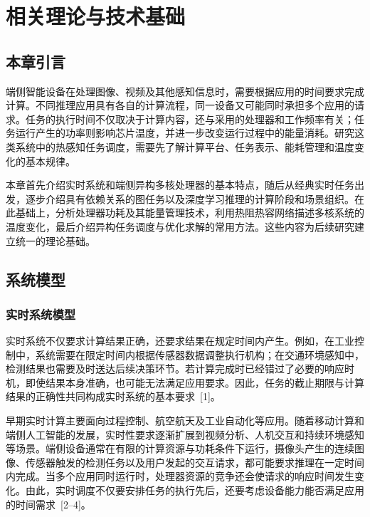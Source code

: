 \chapter{相关理论与技术基础}
\label{ch:foundation}

\section{本章引言}

端侧智能设备在处理图像、视频及其他感知信息时，需要根据应用的时间要求完成计算。不同推理应用具有各自的计算流程，同一设备又可能同时承担多个应用的请求。任务的执行时间不仅取决于计算内容，还与采用的处理器和工作频率有关；任务运行产生的功率则影响芯片温度，并进一步改变运行过程中的能量消耗。研究这类系统中的热感知任务调度，需要先了解计算平台、任务表示、能耗管理和温度变化的基本规律。

本章首先介绍实时系统和端侧异构多核处理器的基本特点，随后从经典实时任务出发，逐步介绍具有依赖关系的图任务以及深度学习推理的计算阶段和场景组织。在此基础上，分析处理器功耗及其能量管理技术，利用热阻热容网络描述多核系统的温度变化，最后介绍异构任务调度与优化求解的常用方法。这些内容为后续研究建立统一的理论基础。

\section{系统模型}

\subsection{实时系统模型}

实时系统不仅要求计算结果正确，还要求结果在规定时间内产生。例如，在工业控制中，系统需要在限定时间内根据传感器数据调整执行机构；在交通环境感知中，检测结果也需要及时送达后续决策环节。若计算完成时已经错过了必要的响应时机，即使结果本身准确，也可能无法满足应用要求。因此，任务的截止期限与计算结果的正确性共同构成实时系统的基本要求~[1]。

早期实时计算主要面向过程控制、航空航天及工业自动化等应用。随着移动计算和端侧人工智能的发展，实时性要求逐渐扩展到视频分析、人机交互和持续环境感知等场景。端侧设备通常在有限的计算资源与功耗条件下运行，摄像头产生的连续图像、传感器触发的检测任务以及用户发起的交互请求，都可能要求推理在一定时间内完成。当多个应用同时运行时，处理器资源的竞争还会使请求的响应时间发生变化。由此，实时调度不仅要安排任务的执行先后，还要考虑设备能力能否满足应用的时间需求~[2--4]。

